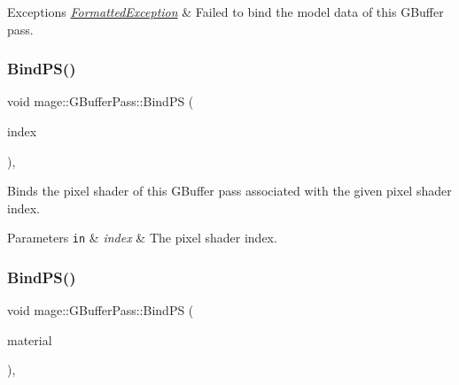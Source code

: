 \begin{DoxyExceptions}{Exceptions}
{\em \hyperlink{structmage_1_1_formatted_exception}{Formatted\+Exception}} & Failed to bind the model data of this G\+Buffer pass. \\
\hline
\end{DoxyExceptions}
\hypertarget{classmage_1_1_g_buffer_pass_a750c27aa6f562b53d62f845ce50e731d}{}\label{classmage_1_1_g_buffer_pass_a750c27aa6f562b53d62f845ce50e731d} 
\subsubsection{\texorpdfstring{Bind\+P\+S()}{BindPS()}\hspace{0.1cm}{\footnotesize\ttfamily [1/2]}}
{\footnotesize\ttfamily void mage\+::\+G\+Buffer\+Pass\+::\+Bind\+PS (\begin{DoxyParamCaption}\item[{\hyperlink{classmage_1_1_g_buffer_pass_a1dbae3cb33d9c90ce7eb8c119d576379}{P\+S\+Index}}]{index }\end{DoxyParamCaption})\hspace{0.3cm}{\ttfamily [private]}, {\ttfamily [noexcept]}}

Binds the pixel shader of this G\+Buffer pass associated with the given pixel shader index.


\begin{DoxyParams}[1]{Parameters}
\mbox{\tt in}  & {\em index} & The pixel shader index. \\
\hline
\end{DoxyParams}
\hypertarget{classmage_1_1_g_buffer_pass_acf03db3d75a3dbacb5c002f6bc72e5ee}{}\label{classmage_1_1_g_buffer_pass_acf03db3d75a3dbacb5c002f6bc72e5ee} 
\subsubsection{\texorpdfstring{Bind\+P\+S()}{BindPS()}\hspace{0.1cm}{\footnotesize\ttfamily [2/2]}}
{\footnotesize\ttfamily void mage\+::\+G\+Buffer\+Pass\+::\+Bind\+PS (\begin{DoxyParamCaption}\item[{const \hyperlink{structmage_1_1_material}{Material} $\ast$}]{material }\end{DoxyParamCaption})\hspace{0.3cm}{\ttfamily [private]}, {\ttfamily [noexcept]}}

